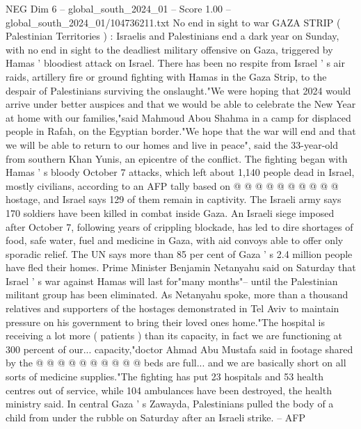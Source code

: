 \begin{textsample}{NEG Dim 6 – global\_south\_2024\_01 – Score 1.00 – global\_south\_2024\_01/104736211.txt}  \label{ex:f6_neg_373}
No end in sight to war GAZA STRIP ( Palestinian Territories ) : Israelis and Palestinians end a dark year on Sunday, with no end in sight to the deadliest military offensive on Gaza, triggered by Hamas ' bloodiest attack on Israel.
There has been no respite from Israel ' s air raids, artillery fire or ground fighting with Hamas in the Gaza Strip, to the despair of Palestinians surviving the onslaught."We were hoping that 2024 would arrive under better auspices and that we would be able to celebrate the New Year at home with our families,"said Mahmoud Abou Shahma in a camp for displaced people in Rafah, on the Egyptian border."We hope that the war will end and that we will be able to return to our homes and live in peace", said the 33-year-old from southern Khan Yunis, an epicentre of the conflict.
The fighting began with Hamas ' s bloody October 7 attacks, which left about 1,140 people dead in Israel, mostly civilians, according to an AFP tally based on @ @ @ @ @ @ @ @ @ @ hostage, and Israel says 129 of them remain in captivity.
The Israeli army says 170 soldiers have been killed in combat inside Gaza.
An Israeli siege imposed after October 7, following years of crippling blockade, has led to dire shortages of food, safe water, fuel and medicine in Gaza, with aid convoys able to offer only sporadic relief.
The UN says more than 85 per cent of Gaza ' s 2.4 million people have fled their homes.
Prime Minister Benjamin Netanyahu said on Saturday that Israel ' s war against Hamas will last for"many months"-- until the Palestinian militant group has been eliminated.
As Netanyahu spoke, more than a thousand relatives and supporters of the hostages demonstrated in Tel Aviv to maintain pressure on his government to bring their loved ones home."The hospital is receiving a lot more ( patients ) than its capacity, in fact we are functioning at 300 percent of our... capacity,"doctor Ahmad Abu Mustafa said in footage shared by the @ @ @ @ @ @ @ @ @ @ beds are full... and we are basically short on all sorts of medicine supplies."The fighting has put 23 hospitals and 53 health centres out of service, while 104 ambulances have been destroyed, the health ministry said.
In central Gaza ' s Zawayda, Palestinians pulled the body of a child from under the rubble on Saturday after an Israeli strike. -- AFP

\end{textsample}
